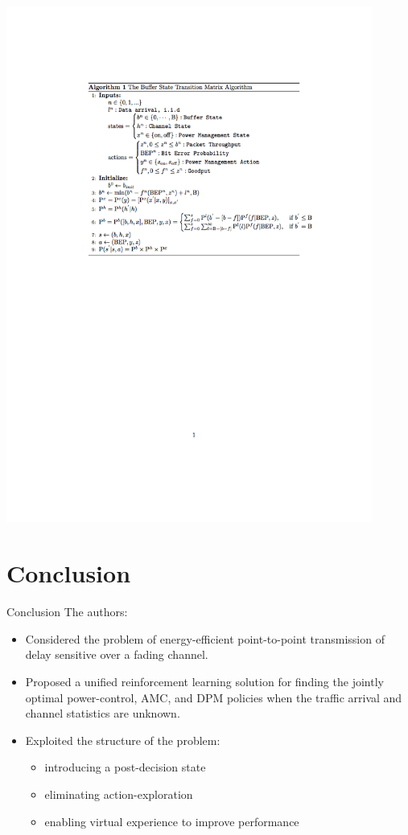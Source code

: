 \documentclass{beamer}
\begin{document}
\begin{frame}
\includegraphics[trim={2cm 10cm 0 2cm},width=12cm]{pseudocodes.jpg}
\end{frame}

\section{Conclusion}
\begin{frame}{Conclusion}
The authors:
\begin{itemize}
\item Considered the problem of energy-efficient point-to-point transmission of delay sensitive over a fading channel. 
\item Proposed a unified reinforcement learning solution for finding the jointly optimal power-control, AMC, and DPM policies when the traffic arrival and channel statistics are unknown. 
\item Exploited the structure of the problem:
\begin{itemize}
\item introducing a post-decision state
\item eliminating action-exploration
\item enabling virtual experience to improve performance
\end{itemize}
\end{itemize}
\end{frame}
\end{document}
